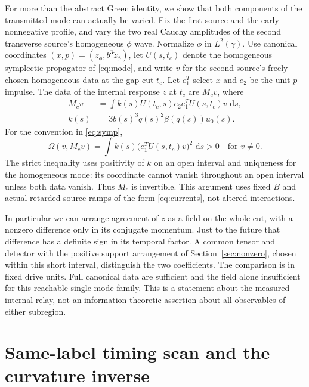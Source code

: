 \documentclass[11pt]{article}
\newcommand{\dd}{\,\mathrm d}
\numberwithin{equation}{section}
\begin{document}
For more than the abstract Green identity, we show that both components of the transmitted mode can actually be varied. Fix the first source and the early nonnegative profile, and vary the two real Cauchy amplitudes of the second transverse source's homogeneous $\phi$ wave. Normalize $\phi$ in $L^2(\gamma)$. Use canonical coordinates $(x,p)=(z_\phi,b^3\dot z_\phi)$, let $U(s,t_c)$ denote the homogeneous symplectic propagator of \eqref{eq:mode}, and write $v$ for the second source's freely chosen homogeneous data at the gap cut $t_c$. Let $e_1^T$ select $x$ and $e_2$ be the unit $p$ impulse. The data of the internal response $z$ at $t_c$ are $M_cv$, where
\begin{equation}
 \begin{aligned}
 M_cv&=\int k(s)U(t_c,s)e_2 e_1^TU(s,t_c)v\,\dd s,\\
 k(s)&=3b(s)^3\dot q(s)^2\beta(q(s))u_0(s).
 \end{aligned}
 \label{eq:M}
\end{equation}
For the convention in \eqref{eq:symp},
\begin{equation}
 \Omega(v,M_cv)=\int k(s)\big(e_1^TU(s,t_c)v\big)^2\,\dd s>0
                                    \quad\text{for }v\ne0 .
 \label{eq:Gram}
\end{equation}
The strict inequality uses positivity of $k$ on an open interval and uniqueness for the homogeneous mode: its coordinate cannot vanish throughout an open interval unless both data vanish. Thus $M_c$ is invertible. This argument uses fixed $B$ and actual retarded source ramps of the form \eqref{eq:currents}, not altered interactions.

In particular we can arrange agreement of $z$ as a field on the whole cut, with a nonzero difference only in its conjugate momentum. Just to the future that difference has a definite sign in its temporal factor. A common tensor and detector with the positive support arrangement of Section~\ref{sec:nonzero}, chosen within this short interval, distinguish the two coefficients. The comparison is in fixed drive units. Full canonical data are sufficient and the field alone insufficient for this reachable single-mode family. This is a statement about the measured internal relay, not an information-theoretic assertion about all observables of either subregion.

\section{Same-label timing scan and the curvature inverse}\label{sec:inverse}
\end{document}
